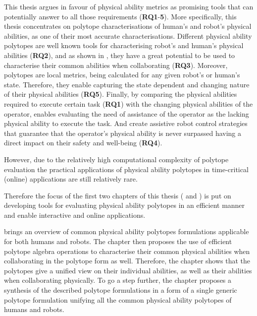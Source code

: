 This thesis argues in favour of physical ability metrics as promising tools that can potentially answer to all those requirements (\textbf{RQ1}-\textbf{5}). More specifically, this thesis concentrates on polytope characterisations of human's and robot's physical abilities, as one of their most accurate characterisations. Different physical ability polytopes are well known tools for characterising robot's and human's physical abilities (\textbf{RQ2}), and as shown in , they have a great potential to be used to characterise their common abilities when collaborating (\textbf{RQ3}). Moreover, polytopes are local metrics, being calculated for any given robot's or human's state. Therefore, they enable capturing the state dependent and changing nature of their physical abilities (\textbf{RQ5}). Finally, by comparing the physical abilities required to execute certain task (\textbf{RQ1}) with the changing physical abilities of the operator, enables evaluating the need of assistance of the operator as the lacking physical ability to execute the task. And create assistive robot control strategies that guarantee that the operator's physical ability is never surpassed having a direct impact on their safety and well-being (\textbf{RQ4}).

However, due to the relatively high computational complexity of polytope evaluation the practical applications of physical ability polytopes in time-critical (online) applications are still relatively rare. 

Therefore the focus of the first two chapters of this thesis  ( and ) is put on developing tools for evaluating physical ability polytopes in an efficient manner and enable interactive and online applications.



 brings an overview of common physical ability polytopes formulations applicable for both humans and robots. The chapter then proposes the use of efficient polytope algebra operations to characterise their common physical abilities when collaborating in the polytope form as well. Therefore, the chapter shows that the polytopes give a unified view on their individual abilities, as well as their abilities when collaborating physically. To go a step further, the chapter proposes a synthesis of the described polytope formulations in a form of a single generic polytope formulation unifying all the common physical ability polytopes of humans and robots.


